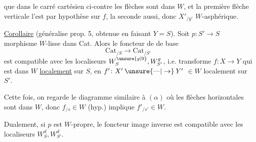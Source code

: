 que dans le carré cartésien ci-contre les flèches  sont dans $W$, et la première flèche verticale l'est par hypothèse sur $f$,  la seconde aussi, donc $X'_{/y'}$ $W$-asphérique.

 \uline{Corollaire} (généralise prop. 5, obtenue en faisant $Y=S$). Soit $p\colon S'\to S$ morphisme $W$-lisse dans Cat. Alors le foncteur de  de base
\[
\mathrm{Cat}_{/S}\longrightarrow\mathrm{Cat}_{/S'}
\]
est compatible avec les localiseurs $W_S^{\unsure{g|9}}, W_{S'}^g$, i.e. transforme $f\colon X\to Y$ qui est dans $W$ \uline{localement} sur $S$, en $f'\colon X'\mathbin{\unsure{\text{---}|\to}}Y'$  $\in W$ localement sur $S'$.

Cette fois, on regarde le diagramme similaire à $(\alpha)$
où les flèches horizontales sont dans $W$, donc $f_{/s}\in W$ (hyp.) implique $f'_{/s'}\in W$.


Dualement, si $p$ est $W$-propre, le foncteur image inverse est compatible avec les localiseurs $W_S^d, W_{S'}^d$.

